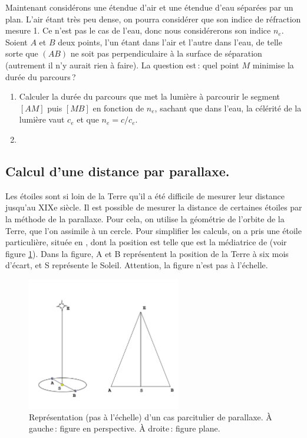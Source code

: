		Maintenant considérons une étendue d'air et une étendue d'eau séparées par un plan. L'air étant très peu dense, on pourra considérer que son indice de réfraction mesure 1. Ce n'est pas le cas de l'eau, donc nous considérerons son indice $n_e$. Soient $A$ et $B$ deux points, l'un étant dans l'air et l'autre dans l'eau, de telle sorte que $(AB)$ ne soit pas perpendiculaire à la surface de séparation (autrement il n'y aurait rien à faire). La question est\,: quel point $M$ minimise la durée du parcours\,? 
		\begin{enumerate}
			\item Calculer la durée du parcours que met la lumière à parcourir le segment $[AM]$ puis $[MB]$ en fonction de $n_e$, sachant que dans l'eau, la célérité de la lumière vaut $c_e$ et que $n_e=c/c_e$.
			\item 
		\end{enumerate}
\fi


	\subsection{Calcul d'une distance par parallaxe.}
		Les étoiles sont si loin de la Terre qu'il a été difficile de mesurer leur distance jusqu'au XIXe siècle. Il est possible de mesurer la distance de certaines étoiles par la méthode de la parallaxe. 
		Pour cela, on utilise la géométrie de l'orbite de la Terre, que l'on assimile à un cercle. 
		Pour simplifier les calculs, on a pris une étoile particulière, située en , dont la position est telle que  est la médiatrice de  (voir figure \ref{fig_par}). Dans la figure, A et B représentent la position de la Terre à six mois d’écart, et S représente le Soleil. Attention, la figure n’est pas à l’échelle.




		\begin{figure}
			\includegraphics[width=0.6\textwidth]{image/fct_trigo/fig2_parallaxe.jpg}
			\caption{Représentation (pas à l'échelle) d'un cas parcitulier de parallaxe. À gauche\,: figure en perspective. À droite\,: figure plane.}
			\label{fig_par}
		\end{figure}


